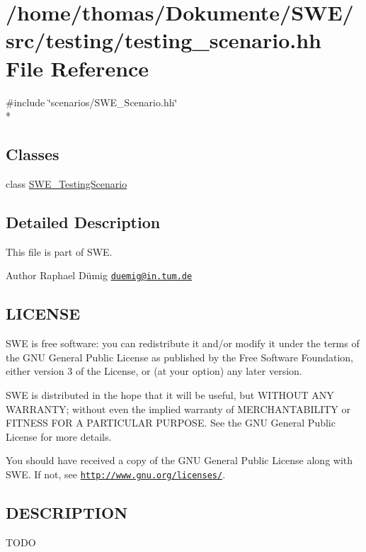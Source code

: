 \hypertarget{testing__scenario_8hh}{\section{/home/thomas/\-Dokumente/\-S\-W\-E/src/testing/testing\-\_\-scenario.hh File Reference}
\label{testing__scenario_8hh}
}
{\ttfamily \#include \char`\"{}scenarios/\-S\-W\-E\-\_\-\-Scenario.\-hh\char`\"{}}\\*
\subsection*{Classes}
\begin{DoxyCompactItemize}
\item 
class \hyperlink{classSWE__TestingScenario}{S\-W\-E\-\_\-\-Testing\-Scenario}
\end{DoxyCompactItemize}


\subsection{Detailed Description}
This file is part of S\-W\-E.

\begin{DoxyAuthor}{Author}
Raphael Dümig \href{mailto:duemig@in.tum.de}{\tt duemig@in.\-tum.\-de} 
\end{DoxyAuthor}
\hypertarget{Writer_8hh_LICENSE}{}\subsection{L\-I\-C\-E\-N\-S\-E}\label{Writer_8hh_LICENSE}
S\-W\-E is free software\-: you can redistribute it and/or modify it under the terms of the G\-N\-U General Public License as published by the Free Software Foundation, either version 3 of the License, or (at your option) any later version.

S\-W\-E is distributed in the hope that it will be useful, but W\-I\-T\-H\-O\-U\-T A\-N\-Y W\-A\-R\-R\-A\-N\-T\-Y; without even the implied warranty of M\-E\-R\-C\-H\-A\-N\-T\-A\-B\-I\-L\-I\-T\-Y or F\-I\-T\-N\-E\-S\-S F\-O\-R A P\-A\-R\-T\-I\-C\-U\-L\-A\-R P\-U\-R\-P\-O\-S\-E. See the G\-N\-U General Public License for more details.

You should have received a copy of the G\-N\-U General Public License along with S\-W\-E. If not, see \href{http://www.gnu.org/licenses/}{\tt http\-://www.\-gnu.\-org/licenses/}.\hypertarget{NetCdfWriter_8hh_DESCRIPTION}{}\subsection{D\-E\-S\-C\-R\-I\-P\-T\-I\-O\-N}\label{NetCdfWriter_8hh_DESCRIPTION}
T\-O\-D\-O 